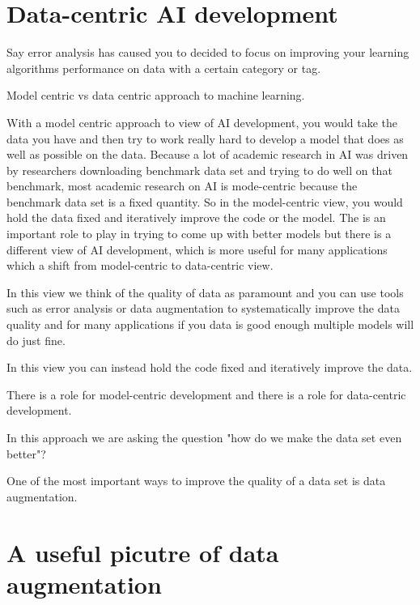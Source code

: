 \section{Data-centric AI development}

Say error analysis has caused you to decided to focus on improving your learning algorithms performance on data with a certain category or tag.

Model centric vs data centric approach to machine learning.

With a model centric approach to view of AI development, you would take the data you have and then try to work really hard to develop a model that does as well as possible on the data.
Because a lot of academic research in AI was driven by researchers downloading benchmark data set and trying to do well on that benchmark, most academic research on AI is mode-centric because the benchmark data set is a fixed quantity.
So in the model-centric view, you would hold the data fixed and iteratively improve the code or the model.
The is an important role to play in trying to come up with better models but there is a different view of AI development, which is more useful for many applications which a shift from model-centric to data-centric view.

In this view we think of the quality of data as paramount and you can use tools such as error analysis or data augmentation to systematically improve the data quality and for many applications if you data is good enough multiple models will do just fine.

In this view you can instead hold the code fixed and iteratively improve the data.

There is a role for model-centric development and there is a role for data-centric development.

In this approach we are asking the question "how do we make the data set even better"?

One of the most important ways to improve the quality of a data set is data augmentation.

\section{A useful picutre of data augmentation}

